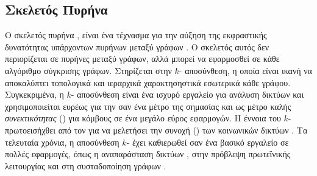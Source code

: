 \subsection{Σκελετός Πυρήνα }
\label{ssec:core}
Ο σκελετός πυρήνα , είναι ένα τέχνασμα για την αύξηση της εκφραστικής δυνατότητας υπάρχοντων πυρήνων μεταξύ γράφων \cite{nikolentzos2018}.
Ο σκελετός αυτός δεν περιορίζεται σε πυρήνες μεταξύ γράφων, αλλά μπορεί να εφαρμοσθεί σε κάθε αλγόριθμο σύγκρισης γράφων.
Στηρίζεται στην $k$- αποσύνθεση, η οποία είναι ικανή να αποκαλύπτει τοπολογικά και ιεραρχικά χαρακτησηστικά εσωτερικά κάθε γράφου.
Συγκεκριμένα, η $k$- αποσύνθεση είναι ένα ισχυρό εργαλείο για ανάλυση δικτύων και χρησιμοποιείται ευρέως για την σαν ένα μέτρο της σημασίας και ως μέτρο καλής \textit{συνεκτικότητας} () για κόμβους σε ένα μεγάλο εύρος εφαρμογών.
Η έννοια του $k$- πρωτοεισήχθει από τον  για να μελετήσει την συνοχή () των κοινωνικών δικτύων \cite{seidman1983network}.
Τα τελευταία χρόνια, η αποσύνθεση $k$- έχει καθιερωθεί σαν ένα βασικό εργαλείο σε πολλές εφαρμογές, όπως η αναπαράσταση δικτύων \cite{alvarez2006large}, στην πρόβλεψη πρωτεϊνικής λειτουργίας \cite{wuchty2005peeling} και στη συσταδοποίηση γράφων \cite{giatsidis2014corecluster}.

